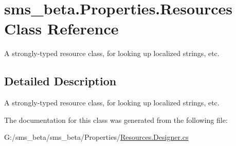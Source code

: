 \hypertarget{classsms__beta_1_1_properties_1_1_resources}{
\section{sms\_\-beta.Properties.Resources Class Reference}
\label{classsms__beta_1_1_properties_1_1_resources}
}


A strongly-\/typed resource class, for looking up localized strings, etc.  




\subsection{Detailed Description}
A strongly-\/typed resource class, for looking up localized strings, etc. 

The documentation for this class was generated from the following file:\begin{DoxyCompactItemize}
\item 
G:/sms\_\-beta/sms\_\-beta/Properties/\hyperlink{_resources_8_designer_8cs}{Resources.Designer.cs}\end{DoxyCompactItemize}
